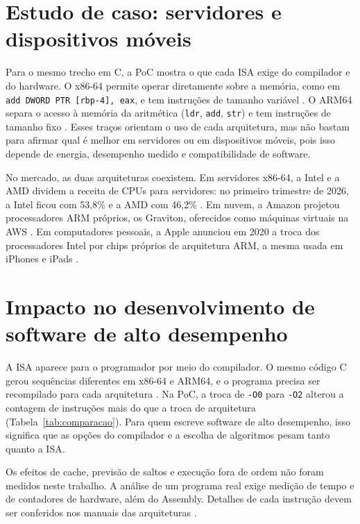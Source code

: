 \section{Estudo de caso: servidores e dispositivos móveis}
Para o mesmo trecho em C, a PoC mostra o que cada ISA exige do compilador e do hardware. O x86-64 permite operar diretamente sobre a memória, como em \texttt{add DWORD PTR [rbp-4], eax}, e tem instruções de tamanho variável \cite{intel2024}. O ARM64 separa o acesso à memória da aritmética (\texttt{ldr}, \texttt{add}, \texttt{str}) e tem instruções de tamanho fixo \cite{arm2024}. Esses traços orientam o uso de cada arquitetura, mas não bastam para afirmar qual é melhor em servidores ou em dispositivos móveis, pois isso depende de energia, desempenho medido e compatibilidade de software.

No mercado, as duas arquiteturas coexistem. Em servidores x86-64, a Intel e a AMD dividem a receita de CPUs para servidores: no primeiro trimestre de 2026, a Intel ficou com 53,8\% e a AMD com 46,2\% \cite{exame2026}. Em nuvem, a Amazon projetou processadores ARM próprios, os Graviton, oferecidos como máquinas virtuais na AWS \cite{register2018}. Em computadores pessoais, a Apple anunciou em 2020 a troca dos processadores Intel por chips próprios de arquitetura ARM, a mesma usada em iPhones e iPads \cite{canaltech2020}.

\section{Impacto no desenvolvimento de software de alto desempenho}
A ISA aparece para o programador por meio do compilador. O mesmo código C gerou sequências diferentes em x86-64 e ARM64, e o programa precisa ser recompilado para cada arquitetura \cite{godbolt}. Na PoC, a troca de \texttt{-O0} para \texttt{-O2} alterou a contagem de instruções mais do que a troca de arquitetura (Tabela~\ref{tab:comparacao}). Para quem escreve software de alto desempenho, isso significa que as opções do compilador e a escolha de algoritmos pesam tanto quanto a ISA.

Os efeitos de cache, previsão de saltos e execução fora de ordem não foram medidos neste trabalho. A análise de um programa real exige medição de tempo e de contadores de hardware, além do Assembly. Detalhes de cada instrução devem ser conferidos nos manuais das arquiteturas \cite{intel2024,arm2024}.